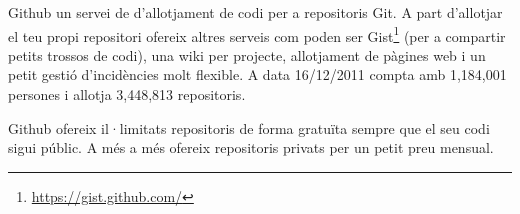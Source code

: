 Github un servei de d'allotjament de codi per a repositoris Git. A part d'allotjar el teu propi repositori ofereix altres serveis com poden ser Gist\footnote{\url{https://gist.github.com/}} (per a compartir petits trossos de codi), una wiki per projecte, allotjament de pàgines web i un petit gestió d'incidències molt flexible. A data 16/12/2011 compta amb 1,184,001 persones i allotja 3,448,813 repositoris.

Github ofereix il·limitats repositoris de forma gratuïta sempre que el seu codi sigui públic. A més a més ofereix repositoris privats per un petit preu mensual. 



